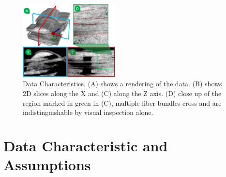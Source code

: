 \begin{figure}[tb]
\centering
\includegraphics[width=0.45\textwidth]{imagesMT2014/MT_data_4_2.png}
\caption{Data Characteristics. (A) shows a rendering of the data. (B) shows 2D slices along the X and (C) along the Z axis. (D) close up of the region marked in green in (C), multiple fiber bundles cross and are indistinguishable by visual inspection alone. }
\label{fig:data-char}
\end{figure}
\section {Data Characteristic and Assumptions}
\label{sec:char_data}

